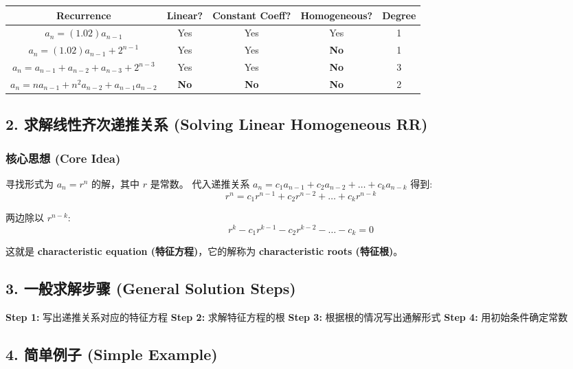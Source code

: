 \documentclass[10pt,a4paper,openany]{ctexbook}
\theoremstyle{definition}
\theoremstyle{remark}
\begin{document}
\begin{center}
\begin{tabular}{ccccc}
\hline
Recurrence & Linear? & Constant Coeff? & Homogeneous? & Degree \\ \hline
$a_n = (1.02)a_{n-1}$ & Yes & Yes & Yes & 1 \\
$a_n = (1.02)a_{n-1} + 2^{n-1}$ & Yes & Yes & \textbf{No} & 1 \\
$a_n = a_{n-1} + a_{n-2} + a_{n-3} + 2^{n-3}$ & Yes & Yes & \textbf{No} & 3 \\
$a_n = n a_{n-1} + n^2 a_{n-2} + a_{n-1}a_{n-2}$ & \textbf{No} & \textbf{No} & \textbf{No} & 2 \\
\hline
\end{tabular}

\end{center}

\vspace{-2pt}

\subsection{2. 求解线性齐次递推关系 (Solving Linear Homogeneous RR)}

\subsubsection{核心思想 (Core Idea)}

寻找形式为 $a_n = r^n$ 的解，其中 $r$ 是常数。
代入递推关系 $a_n = c_1 a_{n-1} + c_2 a_{n-2} + \dots + c_k a_{n-k}$ 得到:
\[
r^n = c_1 r^{n-1} + c_2 r^{n-2} + \dots + c_k r^{n-k}
\]

两边除以 $r^{n-k}$:
\[
r^k - c_1 r^{k-1} - c_2 r^{k-2} - \dots - c_k = 0
\]

这就是 \textbf{characteristic equation (特征方程)}，它的解称为 \textbf{characteristic roots (特征根)}。
\vspace{-2pt}

\subsection{3. 一般求解步骤 (General Solution Steps)}

\textbf{Step 1:} 写出递推关系对应的特征方程
\textbf{Step 2:} 求解特征方程的根
\textbf{Step 3:} 根据根的情况写出通解形式
\textbf{Step 4:} 用初始条件确定常数
\vspace{-2pt}

\subsection{4. 简单例子 (Simple Example)}
\end{document}
